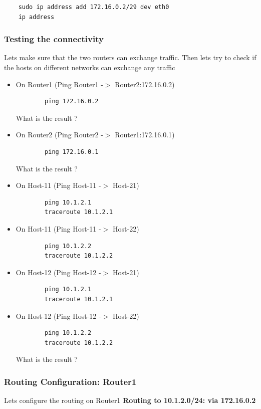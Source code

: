 \begin{verbatim}
    sudo ip address add 172.16.0.2/29 dev eth0
    ip address
\end{verbatim}

\subsubsection{Testing the connectivity}
Lets make sure that the two routers can exchange traffic. Then lets try to check if the hosts on different networks can exchange any traffic
\newline
\begin{itemize}
	\item On Router1 (Ping Router1 -$>$ Router2:172.16.0.2)
	\begin{verbatim}
	    ping 172.16.0.2
	\end{verbatim}

	What is the result ?
	\item On Router2 (Ping Router2 -$>$ Router1:172.16.0.1)
	\begin{verbatim}
	    ping 172.16.0.1
	\end{verbatim}

	What is the result ?
	\item On Host-11 (Ping Host-11 -$>$ Host-21)
	\begin{verbatim}
	    ping 10.1.2.1
	    traceroute 10.1.2.1
	\end{verbatim}

	\item On Host-11 (Ping Host-11 -$>$ Host-22)
	\begin{verbatim}
	    ping 10.1.2.2
	    traceroute 10.1.2.2
	\end{verbatim}

	\item On Host-12 (Ping Host-12 -$>$ Host-21)
	\begin{verbatim}
	    ping 10.1.2.1
	    traceroute 10.1.2.1
	\end{verbatim}

	\item On Host-12 (Ping Host-12 -$>$ Host-22)
	\begin{verbatim}
	    ping 10.1.2.2
	    traceroute 10.1.2.2
	\end{verbatim}

	What is the result ?
\end{itemize}


\subsubsection{Routing Configuration: Router1}
Lets configure the routing on Router1
\textbf{Routing to 10.1.2.0/24: via 172.16.0.2}

